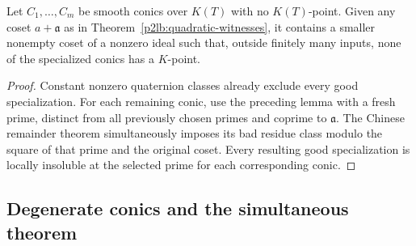\begin{corollary}\label{p2lb:simultaneous-conics}
Let $C_1,\ldots,C_m$ be smooth conics over $K(T)$ with no
$K(T)$-point.  Given any coset $a+\mathfrak a$ as in
Theorem~\ref{p2lb:quadratic-witnesses}, it contains a smaller nonempty
coset of a nonzero ideal such that, outside finitely many inputs, none
of the specialized conics has a $K$-point.
\end{corollary}
\begin{proof}
Constant nonzero quaternion classes already exclude every good
specialization.  For each remaining conic, use the preceding lemma
with a fresh prime, distinct from all previously chosen primes and
coprime to $\mathfrak a$.  The Chinese remainder theorem simultaneously
imposes its bad residue class modulo the square of that prime and the
original coset.  Every resulting good specialization is locally insoluble
at the selected prime for each corresponding conic.
\end{proof}

\subsection{Degenerate conics and the simultaneous theorem}

